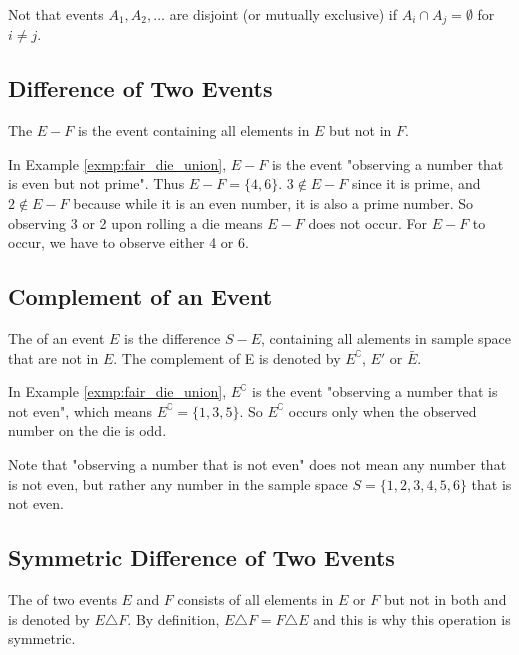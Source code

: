 Not that events \( A_1, A_2, \ldots \) are disjoint (or mutually exclusive) if \( A_i \cap A_j = \emptyset \) for \( i \neq j \).

\subsection{Difference of Two Events}

The  \( E - F \) is the event containing all elements in \( E \) but not in \( F \).

\begin{exmp}
	In Example \autoref{exmp:fair_die_union}, \( E - F \) is the event "observing a number that is even but not prime".
	Thus \( E - F = \{ 4, 6 \} \).
	\( 3 \not\in E - F \) since it is prime, and \( 2 \not\in E - F \) because while it is an even number, it is also a prime number.
	So observing 3 or 2 upon rolling a die means \( E - F \) does not occur.
	For \( E - F \) to occur, we have to observe either 4 or 6.
\end{exmp}

\subsection{Complement of an Event}

The  of an event \( E \) is the difference \( S - E \), containing all alements in sample space that are not in \( E \).
The complement of E is denoted by \( E^\complement \), \( E' \) or \( \bar{E} \).

\begin{exmp}
	In Example \autoref{exmp:fair_die_union}, \( E^\complement \) is the event "observing a number that is not even",
	which means \( E^\complement = \{ 1, 3, 5 \} \).
	So \( E^\complement \) occurs only when the observed number on the die is odd.

	Note that "observing a number that is not even" does not mean any number that is not even, but rather any number in the sample space \( S = \{ 1, 2, 3, 4, 5, 6 \} \) that is not even.
\end{exmp}

\subsection{Symmetric Difference of Two Events}

The  of two events \( E \) and \( F \) consists of all elements in
\( E \) or \( F \) but not in both and is denoted by \( E \triangle F \).
By definition, \( E \triangle F = F \triangle E \) and this is why this operation is symmetric.

